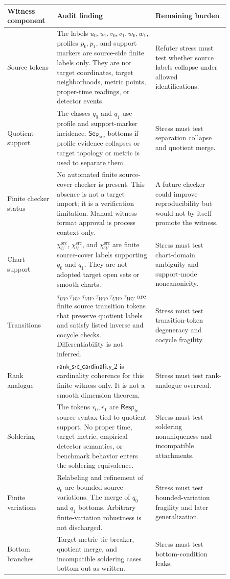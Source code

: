 \documentclass[11pt]{article}
\newcommand{\RespLC}{\mathsf{Resp}_{\mathrm{lc}}}
\newcommand{\SepSrc}{\mathsf{Sep}_{\mathrm{src}}}
\begin{document}
\begin{center}
\begin{tabular}{p{0.20\linewidth}p{0.40\linewidth}p{0.30\linewidth}}
\hline
Witness component & Audit finding & Remaining burden \\
\hline
Source tokens &
The labels \(u_0,u_1,v_0,v_1,w_0,w_1\), profiles \(p_0,p_1\), and
support markers are source-side finite labels only. They are not target
coordinates, target neighborhoods, metric points, proper-time readings, or
detector events. &
Refuter stress must test whether source labels collapse under allowed
identifications. \\
Quotient support &
The classes \(q_0\) and \(q_1\) use profile and support-marker incidence.
\(\SepSrc\) bottoms if profile evidence collapses or target topology or metric
is used to separate them. &
Stress must test separation collapse and quotient merge. \\
Finite checker status &
No automated finite source-cover checker is present. This absence is not a
target import; it is a verification limitation. Manual witness format approval
is process context only. &
A future checker could improve reproducibility but would not by itself promote
the witness. \\
Chart support &
\(\chi_U^{\mathrm{src}}\), \(\chi_V^{\mathrm{src}}\), and
\(\chi_W^{\mathrm{src}}\) are finite source-cover labels supporting \(q_0\)
and \(q_1\). They are not adopted target open sets or smooth charts. &
Stress must test chart-domain ambiguity and support-mode noncanonicity. \\
Transitions &
\(\tau_{UV},\tau_{VU},\tau_{VW},\tau_{WV},\tau_{UW},\tau_{WU}\) are finite
source transition tokens that preserve quotient labels and satisfy listed
inverse and cocycle checks. Differentiability is not inferred. &
Stress must test transition-token degeneracy and cocycle fragility. \\
Rank analogue &
\(\mathsf{rank\_src\_cardinality\_2}\) is cardinality coherence for this
finite witness only. It is not a smooth dimension theorem. &
Stress must test rank-analogue overread. \\
Soldering &
The tokens \(r_0,r_1\) are \(\RespLC\) source syntax tied to quotient support.
No proper time, target metric, empirical detector semantics, or benchmark
behavior enters the soldering equivalence. &
Stress must test soldering nonuniqueness and incompatible attachments. \\
Finite variations &
Relabeling and refinement of \(q_0\) are bounded source variations. The
merge of \(q_0\) and \(q_1\) bottoms. Arbitrary finite-variation robustness is
not discharged. &
Stress must test bounded-variation fragility and later generalization. \\
Bottom branches &
Target metric tie-breaker, quotient merge, and incompatible soldering cases
bottom out as written. &
Stress must test bottom-condition leaks. \\
\hline
\end{tabular}
\end{center}
\end{document}
